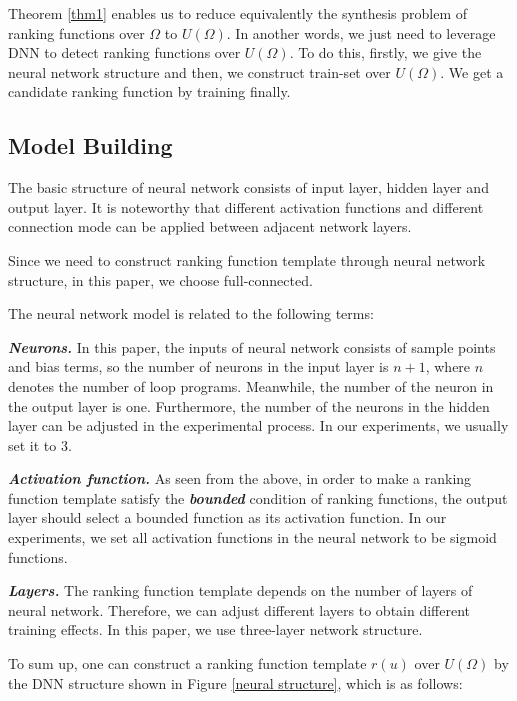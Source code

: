 Theorem \ref{thm1} enables us to reduce equivalently the synthesis problem of ranking functions over $\Omega $ to $U(\Omega )$. In another words, we just need to leverage DNN to detect ranking functions over $U(\Omega )$. To do this, firstly, we give the neural network structure and then, we construct train-set over $U(\Omega )$. We get a candidate ranking function by training finally.

\subsection{Model Building}
\label{Model Building}
The basic structure of neural network consists of input layer, hidden layer and output layer. It is noteworthy that different activation functions and different connection mode can be applied between adjacent network layers.

Since we need to construct ranking function template through neural network structure, in this paper, we choose full-connected.

The neural network model is related to the following terms:

\textbf{\emph{Neurons.}} In this paper, the inputs of neural network consists of sample points and bias terms, so the number of neurons in the input layer is $n+1$, where $n$ denotes the number of loop programs. Meanwhile, the number of the neuron in the output layer is one. Furthermore, the number of the neurons in the hidden layer can be adjusted in the experimental process. In our experiments, we usually set it to 3.

\textbf{\emph{Activation function.}} As seen from the above, in order to make a ranking function template satisfy the \textbf{\emph{bounded}} condition of ranking functions, the output layer should select a bounded function as its activation function. In our experiments, we set all activation functions in the neural network to be sigmoid functions.

\textbf{\emph{Layers.}} The ranking function template depends on the number of layers of neural network. Therefore, we can adjust different layers to obtain different training effects. In this paper, we use three-layer network structure.

To sum up, one can construct a ranking function template $r(u)$ over $U(\Omega )$ by the DNN structure shown in Figure \ref{neural structure}, which is as follows:

